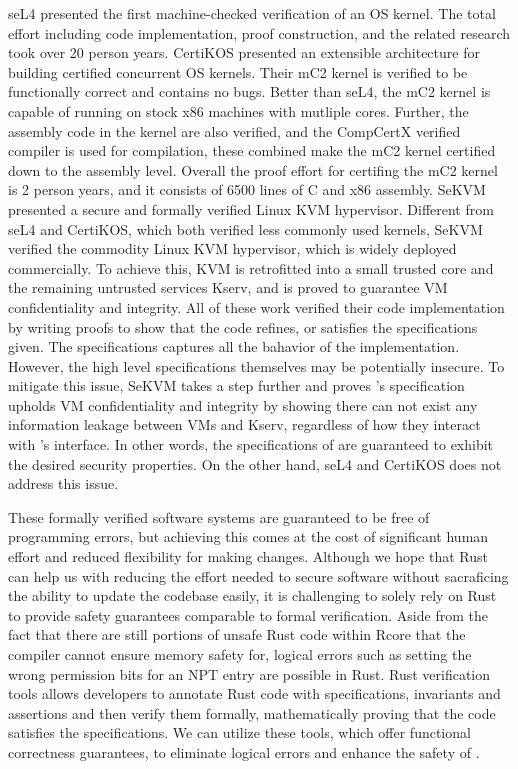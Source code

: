 seL4 \cite{sel4} presented the first machine-checked verification of an OS
kernel. The total effort including code implementation, proof construction,
and the related research took over 20 person years.
CertiKOS \cite{certikos} presented an extensible architecture for building
certified concurrent OS kernels. Their mC2 kernel is verified to be
functionally correct and contains no bugs. Better than seL4, the mC2 kernel
is capable of running on stock x86 machines with mutliple cores. Further,
the assembly code in the kernel are also verified, and the CompCertX verified
compiler is used for compilation, these combined make the mC2 kernel certified
down to the assembly level. Overall the proof effort for certifing the mC2
kernel is 2 person years, and it consists of 6500 lines of C and x86 assembly.
SeKVM \cite{sekvm} presented a secure and formally verified Linux KVM
hypervisor. Different from seL4 and CertiKOS, which both verified less commonly
used kernels, SeKVM verified the commodity Linux KVM hypervisor, which is
widely deployed commercially. To achieve this, KVM is retrofitted into a small
trusted core \secore{} and the remaining untrusted services Kserv, and
\secore{} is proved to guarantee VM confidentiality and integrity.
All of these work verified their code implementation by writing proofs to show
that the code refines, or satisfies the specifications given. The
specifications captures all the bahavior of the implementation.
However, the high level specifications themselves may be potentially insecure.
To mitigate this issue, SeKVM takes a step further and proves \secore{}'s
specification upholds VM confidentiality and integrity by showing there can not
exist any information leakage between VMs and Kserv, regardless of how they
interact with \secore{}'s interface. In other words, the specifications of
\secore{} are guaranteed to exhibit the desired security properties. On the
other hand, seL4 and CertiKOS does not address this issue.

These formally verified software systems are guaranteed to be free of
programming errors, but achieving this comes at the cost of significant human
effort and reduced flexibility for making changes.
Although we hope that Rust can help us with reducing the effort needed to secure
software without sacraficing the ability to update the codebase easily,
it is challenging to solely rely on Rust to provide safety guarantees
comparable to formal verification.
Aside from the fact that there are still portions of unsafe Rust code within
Rcore that the compiler cannot ensure memory safety for,
logical errors such as setting the wrong permission bits for an NPT entry are
possible in Rust.
Rust verification tools \cite{Verus, Prusti, Creusot, Flux} allows developers
to annotate Rust code with specifications, invariants and assertions and then
verify them formally, mathematically proving that the code satisfies the
specifications. We can utilize these tools, which offer functional correctness
guarantees, to eliminate logical errors and enhance the safety of \rustcore{}.

